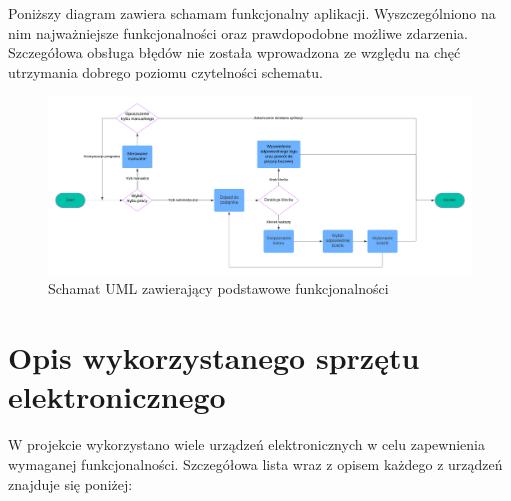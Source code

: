 Poniższy diagram zawiera schamam funkcjonalny aplikacji. Wyszczególniono na nim najważniejsze funkcjonalności oraz prawdopodobne możliwe zdarzenia. Szczegółowa obsługa błędów nie została wprowadzona ze względu na chęć utrzymania dobrego poziomu czytelności schematu. 

\begin{figure}[h]
    \centering
    \includegraphics[width=1.0\textwidth]{./graf/uml.png}
    \caption{Schamat UML zawierający podstawowe funkcjonalności}
    \label{rys1:schemat_uml}
\end{figure}

\section{Opis wykorzystanego sprzętu elektronicznego}
W projekcie wykorzystano wiele urządzeń elektronicznych w celu zapewnienia wymaganej funkcjonalności. Szczegółowa lista wraz z opisem każdego z urządzeń znajduje się poniżej:

